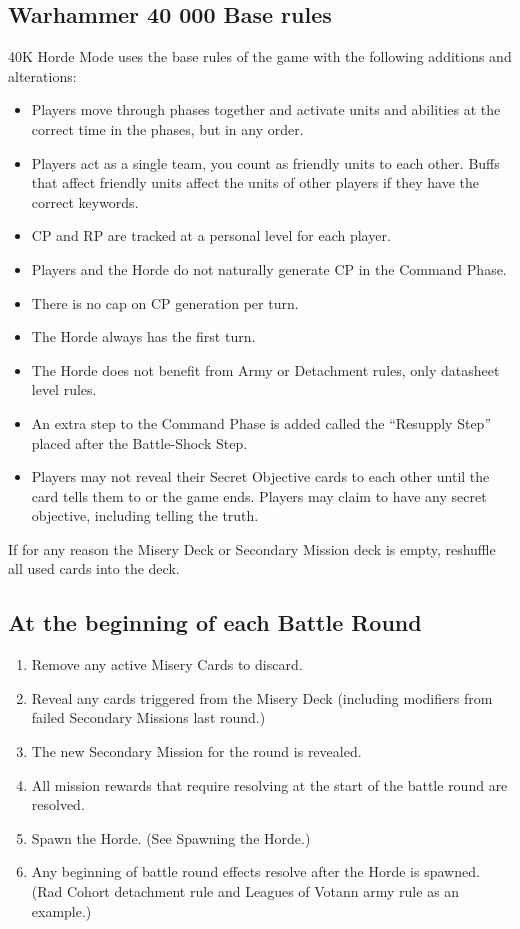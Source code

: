 \documentclass{HordeModeTarot}
\begin{document}
\subsection{Warhammer 40 000 Base rules}
40K Horde Mode uses the base rules of the game with the following additions and alterations:

\begin{itemize}
\item Players move through phases together and activate units and abilities at the correct time in the phases, but in any order.
\item Players act as a single team, you count as friendly units to each other. Buffs that affect friendly units affect the units of other players if they have the correct keywords.
\item CP and RP are tracked at a personal level for each player.
\item Players and the Horde do not naturally generate CP in the Command Phase.
\item There is no cap on CP generation per turn.
\item The Horde always has the first turn.
\item The Horde does not benefit from Army or Detachment rules, only datasheet level rules.
\item An extra step to the Command Phase is added called the “Resupply Step” placed after the Battle-Shock Step.
\item Players may not reveal their Secret Objective cards to each other until the card tells them to or the game ends. Players may claim to have any secret objective, including telling the truth.
\end{itemize}

If for any reason the Misery Deck or Secondary Mission deck is empty, reshuffle all used cards into the deck.


\subsection{At the beginning of each Battle Round}
\begin{enumerate}
\item Remove any active Misery Cards to discard.
\item Reveal any cards triggered from the Misery Deck (including modifiers from failed Secondary Missions last round.)
\item The new Secondary Mission for the round is revealed.
\item All mission rewards that require resolving at the start of the battle round are resolved.
\item Spawn the Horde. (See Spawning the Horde.)
\item Any beginning of battle round effects resolve after the Horde is spawned. (Rad Cohort detachment rule and Leagues of Votann army rule as an example.)
\end{enumerate}
\end{document}
